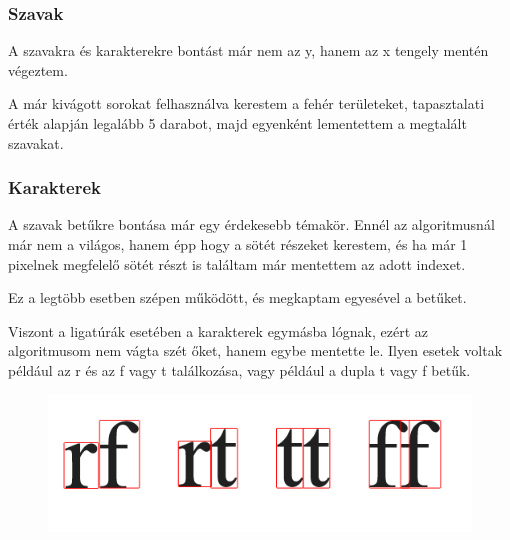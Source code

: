 \documentclass{beamer}
\begin{document}
\begin{frame}[fragile]
\frametitle{Szavak}

A szavakra és karakterekre bontást már nem az y, hanem az x tengely mentén végeztem.

\bigskip

A már kivágott sorokat felhasználva kerestem a fehér területeket, tapasztalati érték alapján legalább 5 darabot, majd egyenként lementettem a megtalált szavakat.

\end{frame}

\begin{frame}[fragile]
\frametitle{Karakterek}

A szavak betűkre bontása már egy érdekesebb témakör. Ennél az algoritmusnál már nem a világos, hanem épp hogy a sötét részeket kerestem, és ha már 1 pixelnek megfelelő sötét részt is találtam már mentettem az adott indexet.

\bigskip

Ez a legtöbb esetben szépen működött, és megkaptam egyesével a betűket.

\bigskip

Viszont a ligatúrák esetében a karakterek egymásba lógnak, ezért az algoritmusom nem vágta szét őket, hanem egybe mentette le.
Ilyen esetek voltak például az r és az f vagy t találkozása, vagy például a dupla t vagy f betűk.

\begin{figure}[!tbp]
  \centering
  \begin{minipage}[b]{0.45\textwidth}
    \includegraphics[width=\textwidth]{images/ligatura.png}
  \end{minipage}
\end{figure}

\end{frame}
\end{document}
